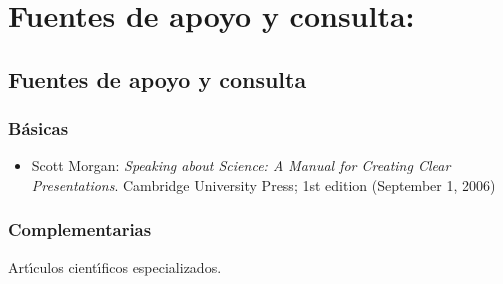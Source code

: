 \documentclass[10 pt]{article}
\begin{document}
\section{Fuentes de apoyo y consulta:}
\subsection{Fuentes de apoyo y consulta}
\subsubsection{B\'{a}sicas}

 \begin{itemize}[itemsep=0em]

\item{Scott {\sc Morgan}: {\em Speaking about Science: A Manual for
      Creating Clear Presentations}.
    Cambridge University Press; 1st edition (September 1, 2006)}

\end{itemize}

\subsubsection{Complementarias}

Art\'{\i}culos cient\'{\i}ficos especializados.

\label{final} %


\end{document}
